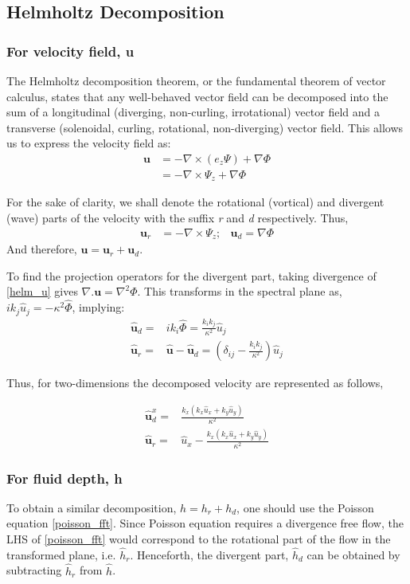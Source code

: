 \subsection{Helmholtz Decomposition}
\subsubsection{For velocity field, u}
The Helmholtz decomposition theorem, or the fundamental theorem of vector 
calculus, 
states that any well-behaved vector field can be decomposed into
the sum of a longitudinal (diverging, non-curling, irrotational) vector field 
and 
a transverse (solenoidal, curling, rotational, non-diverging) vector field. 
This allows us to express the velocity field as:
\begin{align}
\label{helm_u}
\mathbf u & = -\nabla \times (e_z \Psi) + \nabla \Phi\\
	& =  -\nabla \times \Psi_z + \nabla \Phi
\end{align}

For the sake of clarity,
we shall denote the rotational (vortical) and divergent (wave) parts of the 
velocity with the suffix \emph{r} and \emph{d} respectively. Thus,
\begin{align}
\mathbf u_r & = -\nabla \times \Psi_z ; &\mathbf u_d =   \nabla \Phi
\end{align}
And therefore, $\mathbf u  = \mathbf u_r + \mathbf u_d$.

To find the projection operators for the divergent part, taking divergence of 
\eqref{helm_u} gives $\nabla .\mathbf{u} = \nabla^2 \Phi
$.
This transforms in the spectral plane as, $ik_j \hat{u}_j = -\kappa^2 
\hat{\Phi}$, implying:
\begin{align}
\mathbf{\hat{u}}_d =& ik_i \hat{\Phi} = \frac{k_i k_j}{\kappa^2} \hat{u}_j\\
\mathbf{\hat{u}}_r =& \mathbf{\hat{u}} - \mathbf{\hat{u}}_d = \left( \delta_{ij} 
- \frac{k_i k_j}{\kappa^2} \right) \hat{u}_j
\end{align}

Thus, for two-dimensions the decomposed velocity are represented as follows,

\begin{align}
\mathbf{\hat{u}}_d^x =& \frac{k_x (k_x \hat{u}_x + k_y \hat{u}_y)}{\kappa^2} \\
\mathbf{\hat{u}}_r =& \hat{u}_{x} - \frac{k_x  (k_x \hat{u}_x + k_y \hat{u}_y)}{\kappa^2} 
\end{align}

\subsubsection{For fluid depth, h}
To obtain a similar decomposition, $h = h_r + h_d$, one should use the Poisson 
equation \eqref{poisson_fft}.
Since Poisson equation requires a divergence free flow, the LHS of 
\eqref{poisson_fft} would correspond to the rotational part of the flow in the 
transformed plane, i.e. $\hat{h}_r$. Henceforth, the divergent part, $\hat{h}_d$ 
can be obtained by subtracting $\hat{h}_r$ from $\hat{h}$.

